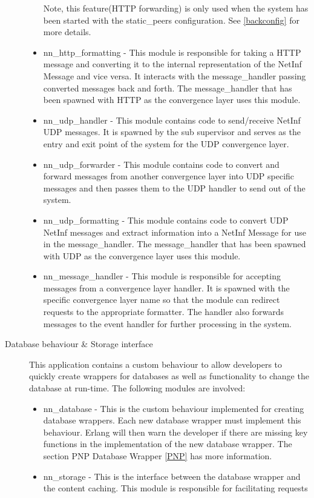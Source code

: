 \begin{description}
\begin{itemize}
Note, this feature(HTTP forwarding) is only used when the system has been started with the static\_peers configuration. See \ref{backconfig} for more details.
\item nn\_http\_formatting - This module is responsible for taking a HTTP message and converting it to the internal representation of the NetInf 
Message and vice versa. It interacts with the message\_handler passing converted messages back and forth. The message\_handler that has been spawned 
with HTTP as the convergence layer uses this module.
\item nn\_udp\_handler - This module contains code to send/receive NetInf UDP messages. It is spawned by the sub supervisor and serves as the entry 
and exit point of the system for the UDP convergence layer.
\item nn\_udp\_forwarder - This module contains code to convert and forward messages from another convergence layer into UDP specific messages and 
then passes them to the UDP handler to send out of the system.
\item nn\_udp\_formatting - This module contains code to convert UDP NetInf messages and extract information into a NetInf Message for use in the 
message\_handler. The message\_handler that has been spawned with UDP as the convergence layer uses this module.
\item nn\_message\_handler - This module is responsible for accepting messages from a convergence layer handler. It is spawned with the specific 
convergence layer name so that the module can redirect requests to the appropriate formatter. The handler also forwards messages to the event 
handler for further processing in the system.
\end{itemize}
\item[Database behaviour \& Storage interface]
This application contains a custom behaviour to allow developers to quickly create wrappers for databases as well as functionality to change the 
database at run-time. The following modules are involved:
\begin {itemize}
\item nn\_database - This is the custom behaviour implemented for creating database wrappers. Each new database wrapper must implement this behaviour. 
Erlang will then warn the developer if there are missing key functions in the implementation of the new database wrapper. The section PNP Database Wrapper 
\ref{PNP} has more information.
\item nn\_storage - This is the interface between the database wrapper and the content caching. This module is responsible for facilitating requests 

\end{itemize}
\end{description}
